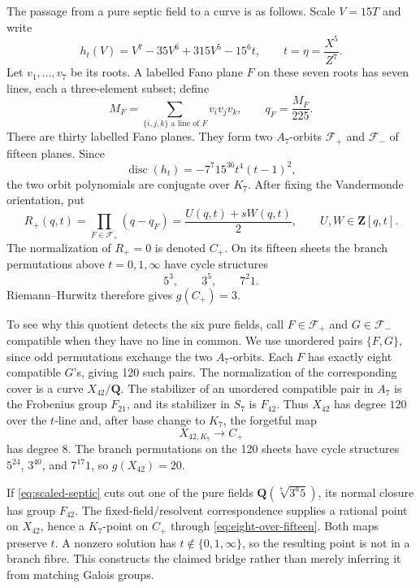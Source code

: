 \documentclass[11pt]{article}
\newcommand{\Q}{\mathbf Q}
\newcommand{\Z}{\mathbf Z}
\newcommand{\disc}{\operatorname{disc}}
\theoremstyle{definition}
\theoremstyle{remark}
\begin{document}
The passage from a pure septic field to a curve is as follows.  Scale
$V=15T$ and write
\begin{equation}\label{eq:scaled-septic}
 h_t(V)=V^7-35V^6+315V^5-15^6t,
 \qquad t=\eta=\frac{X^5}{Z^7}.
\end{equation}
Let $v_1,\ldots,v_7$ be its roots.  A labelled Fano plane $F$ on these
seven roots has seven lines, each a three-element subset; define
\begin{equation}\label{eq:fano-invariant}
 M_F=\sum_{\{i,j,k\}\text{ a line of }F}v_iv_jv_k,
 \qquad q_F=\frac{M_F}{225}.
\end{equation}
There are thirty labelled Fano planes.  They form two $A_7$-orbits
$\mathcal F_+$ and $\mathcal F_-$ of fifteen planes.  Since
\[
 \disc(h_t)=-7^7 15^{36}t^4(t-1)^2,
\]
the two orbit polynomials are conjugate over $K_7$.  After fixing the
Vandermonde orientation, put
\begin{equation}\label{eq:plus-resolvent}
 R_+(q,t)=\prod_{F\in\mathcal F_+}(q-q_F)
          =\frac{U(q,t)+sW(q,t)}2,
 \qquad U,W\in\Z[q,t].
\end{equation}
The normalization of $R_+=0$ is denoted $C_+$.  On its fifteen sheets the
branch permutations above $t=0,1,\infty$ have cycle structures
\[
                         5^3,\qquad3^5,\qquad7^2 1.
\]
Riemann--Hurwitz therefore gives $g(C_+)=3$.

To see why this quotient detects the six pure fields, call
$F\in\mathcal F_+$ and $G\in\mathcal F_-$ compatible when they have no
line in common.  We use unordered pairs $\{F,G\}$, since odd
permutations exchange the two $A_7$-orbits.  Each $F$ has exactly eight
compatible $G$'s, giving 120 such pairs.  The normalization of the
corresponding cover is a curve $X_{42}/\Q$.  The stabilizer of an
unordered compatible pair in $A_7$ is the Frobenius group $F_{21}$,
and its stabilizer in $S_7$ is $F_{42}$.  Thus $X_{42}$ has degree $120$
over the $t$-line and, after base change to $K_7$, the forgetful map
\begin{equation}\label{eq:eight-over-fifteen}
                         X_{42,K_7}\longrightarrow C_+
\end{equation}
has degree $8$.  The branch permutations on the 120 sheets have cycle
structures $5^{24}$, $3^{40}$, and $7^{17}1$, so $g(X_{42})=20$.

If \eqref{eq:scaled-septic} cuts out one of the pure fields
$\Q(\sqrt[7]{3^a5})$, its normal closure has group $F_{42}$.  The
fixed-field/resolvent correspondence supplies a rational point on
$X_{42}$, hence a $K_7$-point on $C_+$ through
\eqref{eq:eight-over-fifteen}.  Both maps preserve $t$.  A nonzero
solution has $t\notin\{0,1,\infty\}$, so the resulting point is not in a
branch fibre.  This constructs the claimed bridge rather than merely
inferring it from matching Galois groups.
\end{document}
